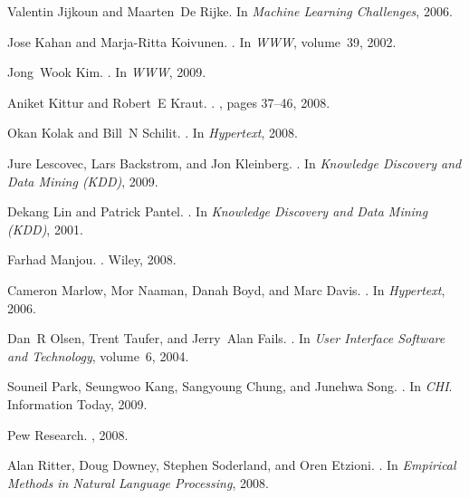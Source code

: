 \documentclass{www2010-accepted}
\begin{document}
\begin{thebibliography}{10}
Valentin Jijkoun and Maarten~De Rijke.
\newblock In {\em Machine Learning Challenges}, 2006.

Jose Kahan and Marja-Ritta Koivunen.
.
\newblock In {\em WWW}, volume~39, 2002.

Jong~Wook Kim.
.
\newblock In {\em WWW}, 2009.

Aniket Kittur and Robert~E Kraut.
.
, pages 37--46, 2008.

Okan Kolak and Bill~N Schilit.
.
\newblock In {\em Hypertext}, 2008.

Jure Lescovec, Lars Backstrom, and Jon Kleinberg.
.
\newblock In {\em Knowledge Discovery and Data Mining (KDD)}, 2009.

Dekang Lin and Patrick Pantel.
.
\newblock In {\em Knowledge Discovery and Data Mining (KDD)}, 2001.

Farhad Manjou.
.
\newblock Wiley, 2008.

Cameron Marlow, Mor Naaman, Danah Boyd, and Marc Davis.
.
\newblock In {\em Hypertext}, 2006.

Dan~R Olsen, Trent Taufer, and Jerry~Alan Fails.
.
\newblock In {\em User Interface Software and Technology}, volume~6, 2004.

Souneil Park, Seungwoo Kang, Sangyoung Chung, and Junehwa Song.
.
\newblock In {\em CHI}. Information Today, 2009.

Pew Research.
, 2008.

Alan Ritter, Doug Downey, Stephen Soderland, and Oren Etzioni.
.
\newblock In {\em Empirical Methods in Natural Language Processing}, 2008.


\end{thebibliography}
\end{document}
